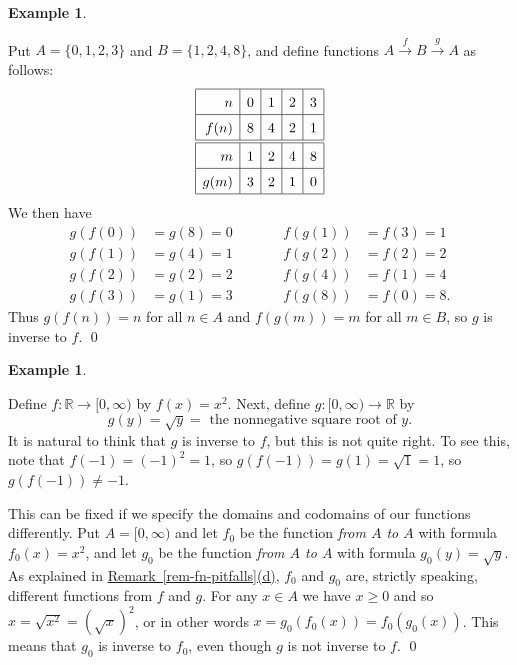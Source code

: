 \documentclass[a4paper]{book}
\newcommand{\RED}[1]{{\color{red}#1}}
\newcommand{\R}         {{\mathbb{R}}}
\newcommand{\xra}       {\xrightarrow}
\renewcommand{\:}{\colon}
\newcommand{\bilabel}[1]{\hypertarget{#1}{\label{#1}}}
\newcommand{\EMPH}[1]{\RED{\emph{#1}}}
\theoremstyle{definition}
\newtheorem{example}[theorem]{Example}
\begin{document}
\begin{example}\bilabel{eg-finite-inverse}
 Put $A=\{0,1,2,3\}$ and $B=\{1,2,4,8\}$, and define functions
 $A\xra{f}B\xra{g}A$ as follows:
 \[ \renewcommand{\arraystretch}{1.5}
  \begin{array}{|r|c|c|c|c|}
   \hline
    n    & 0 & 1 & 2 & 3 \\
   \hline
    f(n) & 8 & 4 & 2 & 1 \\ 
   \hline\hline
    m    & 1 & 2 & 4 & 8 \\
   \hline
    g(m) & 3 & 2 & 1 & 0 \\
   \hline
  \end{array}
 \]
 We then have 
 \[ \renewcommand{\arraystretch}{1.5}
  \begin{array}{rlcrl}
   g(f(0)) &= g(8) = 0 & \qquad & f(g(1)) &= f(3) = 1 \\
   g(f(1)) &= g(4) = 1 & \qquad & f(g(2)) &= f(2) = 2 \\
   g(f(2)) &= g(2) = 2 & \qquad & f(g(4)) &= f(1) = 4 \\
   g(f(3)) &= g(1) = 3 & \qquad & f(g(8)) &= f(0) = 8.
  \end{array}
 \]
 Thus $g(f(n))=n$ for all $n\in A$ and $f(g(m))=m$ for all $m\in B$,
 so $g$ is inverse to $f$. \qed
\end{example}
\begin{example}\bilabel{eg-sqrt-inverse}
 Define $f\:\R\xra{}[0,\infty)$ by $f(x)=x^2$.  Next, define
 $g\:[0,\infty)\xra{}\R$ by 
 \[ g(y) = \sqrt{y} = \text{ the nonnegative square root of } y. \]
 It is natural to think that $g$ is inverse to $f$, but this is not
 quite right.  To see this, note that $f(-1)=(-1)^2=1$, so
 $g(f(-1))=g(1)=\sqrt{1}=1$, so $g(f(-1))\neq -1$.
 
 This can be fixed if we specify the domains and codomains of our
 functions differently.  Put $A=[0,\infty)$ and let $f_0$ be the
 function \EMPH{from $A$ to $A$} with formula $f_0(x)=x^2$, and let
 $g_0$ be the function \EMPH{from $A$ to $A$} with formula
 $g_0(y)=\sqrt{y}$.  As explained in
 \hyperlink{rem-fn-pitfalls}{Remark~\ref{rem-fn-pitfalls}(d)}, $f_0$
 and $g_0$ are, strictly speaking, different functions from $f$ and
 $g$.  For any $x\in A$ we have $x\geq 0$ and so
 $x=\sqrt{x^2}=(\sqrt{x})^2$, or in other words
 $x=g_0(f_0(x))=f_0(g_0(x))$.  This means that $g_0$ is inverse to
 $f_0$, even though $g$ is not inverse to $f$. \qed
\end{example}
\end{document}

